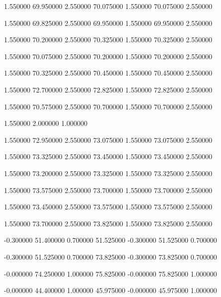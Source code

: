  {1.550000} {69.950000} {2.550000} {70.075000} {1.550000} {70.075000} {2.550000}

 {1.550000} {69.825000} {2.550000} {69.950000} {1.550000} {69.950000} {2.550000}

 {1.550000} {70.200000} {2.550000} {70.325000} {1.550000} {70.325000} {2.550000}

 {1.550000} {70.075000} {2.550000} {70.200000} {1.550000} {70.200000} {2.550000}

 {1.550000} {70.325000} {2.550000} {70.450000} {1.550000} {70.450000} {2.550000}

 {1.550000} {72.700000} {2.550000} {72.825000} {1.550000} {72.825000} {2.550000}

 {1.550000} {70.575000} {2.550000} {70.700000} {1.550000} {70.700000} {2.550000}

 {1.550000} {2.000000} {1.000000}

 {1.550000} {72.950000} {2.550000} {73.075000} {1.550000} {73.075000} {2.550000}

 {1.550000} {73.325000} {2.550000} {73.450000} {1.550000} {73.450000} {2.550000}

 {1.550000} {73.200000} {2.550000} {73.325000} {1.550000} {73.325000} {2.550000}

 {1.550000} {73.575000} {2.550000} {73.700000} {1.550000} {73.700000} {2.550000}

 {1.550000} {73.450000} {2.550000} {73.575000} {1.550000} {73.575000} {2.550000}

 {1.550000} {73.700000} {2.550000} {73.825000} {1.550000} {73.825000} {2.550000}

 {-0.300000} {51.400000} {0.700000} {51.525000} {-0.300000} {51.525000} {0.700000}

 {-0.300000} {51.525000} {0.700000} {73.825000} {-0.300000} {73.825000} {0.700000}

 {-0.000000} {74.250000} {1.000000} {75.825000} {-0.000000} {75.825000} {1.000000}

 {-0.000000} {44.400000} {1.000000} {45.975000} {-0.000000} {45.975000} {1.000000}

